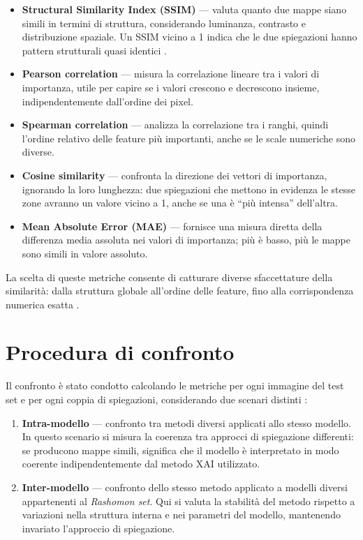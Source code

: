 \documentclass[12pt,a4paper,oneside]{report}
\numberwithin{figure}{chapter}
\numberwithin{table}{chapter}
\begin{document}
\begin{itemize}
      \item \textbf{Structural Similarity Index (SSIM)} — valuta quanto due mappe siano simili in termini di struttura, considerando luminanza, contrasto e distribuzione spaziale. Un SSIM vicino a 1 indica che le due spiegazioni hanno pattern strutturali quasi identici \citep{wang2004ssim}.
      \item \textbf{Pearson correlation} — misura la correlazione lineare tra i valori di importanza, utile per capire se i valori crescono e decrescono insieme, indipendentemente dall’ordine dei pixel.
      \item \textbf{Spearman correlation} — analizza la correlazione tra i ranghi, quindi l’ordine relativo delle feature più importanti, anche se le scale numeriche sono diverse.
      \item \textbf{Cosine similarity} — confronta la direzione dei vettori di importanza, ignorando la loro lunghezza: due spiegazioni che mettono in evidenza le stesse zone avranno un valore vicino a 1, anche se una è ``più intensa'' dell’altra.
      \item \textbf{Mean Absolute Error (MAE)} — fornisce una misura diretta della differenza media assoluta nei valori di importanza; più è basso, più le mappe sono simili in valore assoluto.
\end{itemize}

La scelta di queste metriche consente di catturare diverse sfaccettature della
similarità: dalla struttura globale all’ordine delle feature, fino alla
corrispondenza numerica esatta \citep{leventi2023consistency,
      samek2016evaluating}.

\section{Procedura di confronto}
Il confronto è stato condotto calcolando le metriche per ogni immagine del test
set e per ogni coppia di spiegazioni, considerando due scenari distinti
\citep{bhatt2021evaluating, mueller2023rashomon, leventi2023consistency,
      krishna2022disagreement}:

\begin{enumerate}
      \item \textbf{Intra-modello} — confronto tra metodi diversi applicati allo stesso modello.
            In questo scenario si misura la coerenza tra approcci di spiegazione differenti:
            se producono mappe simili, significa che il modello è interpretato in modo coerente
            indipendentemente dal metodo XAI utilizzato.

      \item \textbf{Inter-modello} — confronto dello stesso metodo applicato a modelli diversi
            appartenenti al \emph{Rashomon set}.
            Qui si valuta la stabilità del metodo rispetto a variazioni nella struttura interna
            e nei parametri del modello, mantenendo invariato l’approccio di spiegazione.
\end{enumerate}
\end{document}
